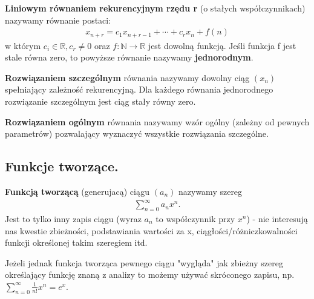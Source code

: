 \documentclass[12pt]{article}
\begin{document}
    \begin{definition}
        \textbf{Liniowym równaniem rekurencyjnym rzędu r} (o stałych współczynnikach) nazywamy równanie postaci:
        \begin{align*}
            x_{n+r} = c_1 x_{n+r-1} +  \cdots + c_r x_n + f(n)
        \end{align*}
        w którym $c_i  \in \mathbb{R}, c_r \neq 0$  oraz $f:  \mathbb{N} \rightarrow \mathbb{R}$ jest dowolną funkcją.
        Jeśli funkcja f jest stale równa zero, to powyższe równanie nazywamy \textbf{jednorodnym}.
    \end{definition}

    \begin{definition}
        \textbf{Rozwiązaniem szczególnym} równania nazywamy dowolny ciąg $(x_n)$ spełniający zależność rekurencyjną.
        Dla każdego równania jednorodnego rozwiązanie szczególnym jest ciąg stały równy zero.

        \textbf{Rozwiązaniem ogólnym} równania nazywamy wzór ogólny (zależny od pewnych parametrów) pozwalający
        wyznaczyć wszystkie rozwiązania szczególne.
    \end{definition}

    \subsection{Funkcje tworzące.}
    \begin{definition}
        \textbf{Funkcją tworzącą} (generujacą) ciągu $(a_n)$ nazywamy szereg
        \begin{align*}
            \sum_{n=0}^{\infty} a_n x^n.
        \end{align*}
        Jest to tylko inny zapis ciągu (wyraz $a_n$ to współczynnik przy $x^n$) - nie interesują nas kwestie zbieżności,
        podstawiania wartości za x, ciągłości/różniczkowalności funkcji określonej takim szeregiem itd.

        Jeżeli jednak funkcja tworząca pewnego ciągu "wygląda" jak zbieżny szereg określający funkcję znaną z analizy
        to możemy używać skróconego zapisu, np. $\sum_{n=0}^{\infty} \frac{1}{n!} x^n = e^x$.
    \end{definition}
\end{document}
